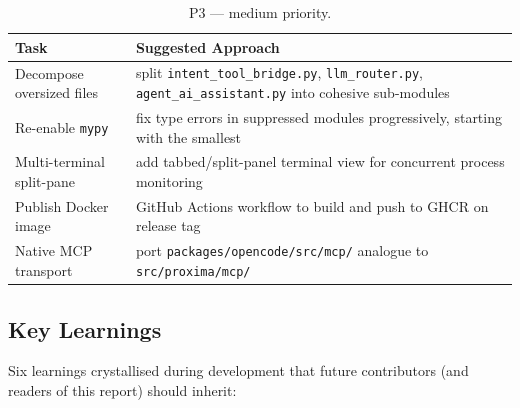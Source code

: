 \documentclass[11pt,a4paper]{article}
\begin{document}
\begin{table}[!h]
\centering
\footnotesize
\renewcommand{\arraystretch}{1.2}
\caption{\textcolor{p3color}{P3 --- medium priority.}}
\begin{tabular}{@{}p{3.8cm}p{10.8cm}@{}}
\toprule
\textbf{Task} & \textbf{Suggested Approach} \\
\midrule
Decompose oversized files   & split \texttt{intent\_tool\_bridge.py}, \texttt{llm\_router.py}, \texttt{agent\_ai\_assistant.py} into cohesive sub-modules \\
Re-enable \texttt{mypy}     & fix type errors in suppressed modules progressively, starting with the smallest \\
Multi-terminal split-pane   & add tabbed/split-panel terminal view for concurrent process monitoring \\
Publish Docker image        & GitHub Actions workflow to build and push to GHCR on release tag \\
Native MCP transport        & port \texttt{packages/opencode/src/mcp/} analogue to \texttt{src/proxima/mcp/} \\
\bottomrule
\end{tabular}
\end{table}

\subsection{Key Learnings}

Six learnings crystallised during development that future contributors (and
readers of this report) should inherit:
\end{document}
